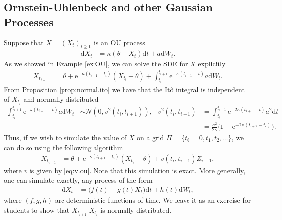 \documentclass[12pt]{book}
\numberwithin{equation}{chapter}
\theoremstyle{plain}
\numberwithin{theorem}{section}
\theoremstyle{definition}
\numberwithin{exercise}{chapter}
\newcommand{\<}{\langle}
\renewcommand{\>}{\rangle}
\renewcommand{\(}{\left(}
\renewcommand{\)}{\right)}
\renewcommand{\[}{\left[}
\renewcommand{\]}{\right]}
\newcommand\Nc{\mathscr{N}}
\newcommand\dd{\mathrm{d}}
\newcommand\ee{\mathrm{e}}
\begin{document}
\subsection{Ornstein-Uhlenbeck and other Gaussian Processes}
Suppose that $X=(X_t)_{t \geq 0}$ is an OU process
\begin{align}
\dd X_t
	&=	\kappa ( \theta - X_t) \dd t + a \dd W_t .
\end{align}
As we showed in Example \ref{ex:OU}, we can solve the SDE for $X$ explicitly
\begin{align}
X_{t_{i+1}}
	&=	\theta + \ee^{- \kappa (t_{i+1} - t_i)} ( X_{t_i} - \theta ) + \int_{t_i}^{t_{i+1}} \ee^{-\kappa(t_{i+1}-t)} a \dd W_t .
\end{align}
From Proposition \ref{prop:normal.ito} we have that the It\^o integral is independent of $X_{t_i}$ and normally distributed
\begin{align}
\int_{t_i}^{t_{i+1}} \ee^{-\kappa(t_{i+1}-t)} a \dd W_t
	&\sim \Nc(0,v^2(t_i,t_{i+1})) , &
v^2(t_i,t_{i+1})
	&=	\int_{t_i}^{t_{i+1}} \ee^{- 2 \kappa(t_{i+1}-t)} a^2 \dd t \\ & &
	&=	\frac{a^2}{2\kappa} \Big( 1 - \ee^{-2 \kappa (t_{i+1} - t_i)} \Big) . \label{eq:v.ou}
\end{align}
Thus, if we wish to simulate the value of $X$ on a grid $\Pi = \{ t_0 = 0, t_1, t_2, \ldots \}$, we can do so using the following algorithm
\begin{align}
X_{{t_{i+1}}}
	&=	\theta + \ee^{- \kappa (t_{i+1} - t_i)} ( X_{t_i} - \theta ) + v(t_i,t_{i+1}) Z_{i+1} ,
\end{align}
where $v$ is given by \eqref{eq:v.ou}.  Note that this simulation is exact.  More generally, one can simulate exactly, any process of the form
\begin{align}
\dd X_t
	&=	\Big( f(t) + g(t) X_t \Big) \dd t + h(t) \dd W_t ,
\end{align}
where $(f,g,h)$ are deterministic functions of time.  We leave it as an exercise for students to show that $X_{t_{i+1}} | X_{t_i}$ is normally distributed. 
\end{document}
